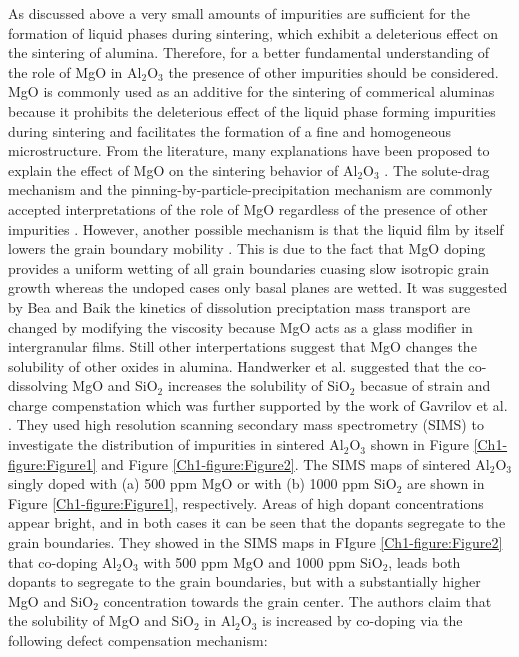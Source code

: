 As discussed above a very small amounts of impurities are sufficient for the formation of liquid phases during sintering, which exhibit a deleterious effect on the sintering of alumina. Therefore, for a better fundamental understanding of the role of MgO in Al$_{2}$O$_{3}$ the presence of other impurities should be considered. MgO is commonly used as an additive for the sintering of commerical aluminas because it prohibits the deleterious effect of the liquid phase forming impurities during sintering and facilitates the formation of a fine and homogeneous microstructure. From the literature, many explanations have been proposed to explain the effect of MgO on the sintering behavior of Al$_{2}$O$_{3}$ \cite{Compson2013} \cite{Bateman1989}. The solute-drag mechanism and the pinning-by-particle-precipitation mechanism are commonly accepted interpretations of the role of MgO regardless of the presence of other impurities \cite{Soni1995,Bennison1983}. However, another possible mechanism is that the liquid film by itself lowers the grain boundary mobility \cite{Bennison1990a}. This is due to the fact that MgO doping provides a uniform wetting of all grain boundaries cuasing slow isotropic grain growth whereas the undoped cases only basal planes are wetted. It was suggested by Bea and Baik \cite{Bae1994} the kinetics of dissolution preciptation mass transport are changed by modifying the viscosity because MgO acts as a glass modifier in intergranular films. Still other interpertations suggest that MgO changes the solubility of other oxides in alumina. Handwerker et al. \cite{Handwerker1989} suggested that the co-dissolving MgO and SiO$_{2}$ increases the solubility of SiO$_{2}$ becasue of strain and charge compenstation which was further supported by the work of Gavrilov et al. \cite{Gavrilov1999}. They used high resolution scanning secondary mass spectrometry (SIMS) to investigate the distribution of impurities in sintered Al$_{2}$O$_{3}$ shown in Figure \ref{Ch1-figure:Figure1} and Figure \ref{Ch1-figure:Figure2}. The SIMS maps of sintered Al$_{2}$O$_{3}$ singly doped with (a) 500 ppm MgO or with (b) 1000 ppm SiO$_{2}$ are shown in Figure \ref{Ch1-figure:Figure1}, respectively. Areas of high dopant concentrations appear bright, and in both cases it can be seen that the dopants segregate to the grain boundaries. They showed in the SIMS maps in FIgure \ref{Ch1-figure:Figure2} that co-doping Al$_{2}$O$_{3}$ with 500 ppm MgO and 1000 ppm SiO$_{2}$, leads both dopants to segregate to the grain boundaries, but with a substantially higher MgO and SiO$_{2}$ concentration towards the grain center. The authors claim that the solubility of MgO and SiO$_{2}$ in Al$_{2}$O$_{3}$ is increased by co-doping via the following defect compensation mechanism:

